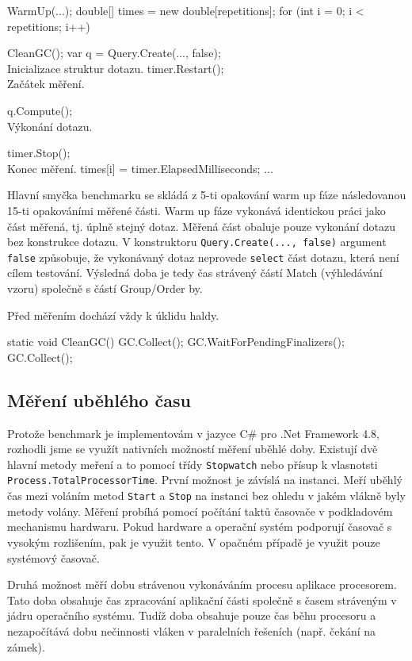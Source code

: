\begin{code}
WarmUp(...);
double[] times = new double[repetitions];
for (int i = 0; i < repetitions; i++) {
    CleanGC();
    var q = Query.Create(..., false);  \\ Inicializace struktur dotazu.
    timer.Restart();  \\ Začátek měření.

    q.Compute();      \\ Výkonání dotazu.
    
    timer.Stop();     \\ Konec měření. 
    times[i] = timer.ElapsedMilliseconds;
    ...
}
\end{code}

Hlavní smyčka benchmarku se skládá z 5-ti opakování warm up fáze následovanou 15-ti opakováními měřené části.
Warm up fáze vykonává identickou práci jako část měřená, tj. úplně stejný dotaz. 
Měřená část obaluje pouze vykonání dotazu bez konstrukce dotazu. 
V konstruktoru \verb+Query.Create(..., false)+ argument \verb+false+ způsobuje, že vykonávaný dotaz neprovede \verb+select+ část dotazu, která není cílem testování.
Výsledná doba je tedy čas strávený částí Match (výhledávání vzoru) společně s částí Group/Order by. 

Před měřením dochází vždy k úklidu haldy. 
\begin{code}
static void CleanGC()
{
    GC.Collect();
    GC.WaitForPendingFinalizers();
    GC.Collect();
}
\end{code}

\subsection{Měření uběhlého času}

Protože benchmark je implementovám v jazyce C\# pro .Net Framework 4.8, rozhodli jsme se využít nativních možností měření uběhlé doby.
Existují dvě hlavní metody meření a to pomocí třídy \texttt{Stopwatch} nebo přísup k vlasnotsti \texttt{Process.TotalProcessorTime}.
První možnost je závíslá na instanci.
Meří uběhlý čas mezi voláním metod \texttt{Start} a \texttt{Stop} na instanci bez ohledu v jakém vlákně byly metody volány.
Měření probíhá pomocí počítání taktů časovače v podkladovém mechanismu hardwaru.
Pokud hardware a operační systém podporují časovač s vysokým rozlišením, pak je využit tento.
V opačném případě je využit pouze systémový časovač. 

Druhá možnost měří dobu strávenou vykonáváním procesu aplikace procesorem.
Tato doba obsahuje čas zpracování aplikační části společně s časem stráveným v jádru operačního systému.
Tudíž doba obsahuje pouze čas běhu procesoru a nezapočítává dobu nečinnosti vláken v paralelních řešeních (např. čekání na zámek).

